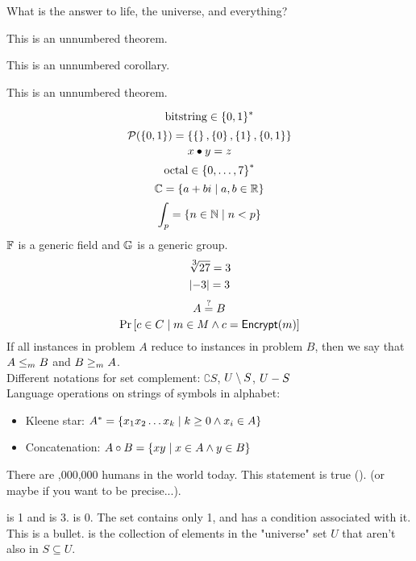 \documentclass{article}
\begin{document}
\begin{problem}
    What is the answer to life, the universe, and everything?
\end{problem}
\begin{solution}
    \begin{theorem*}
        This is an unnumbered theorem.
    \end{theorem*}
    \begin{corollary*}
        This is an unnumbered corollary.
    \end{corollary*}
    \begin{lemma*}
        This is an unnumbered theorem.
    \end{lemma*}
    $$\str{bitstring} \in \bitset$$
    $$\mathcal{P}(\left\{ 0,1 \right\}) = \left\{ \left\{  \right\}, \left\{ 0 \right\}, \left\{ 1 \right\}, \left\{ 0,1 \right\} \right\}$$
    $$x \bullet y = z$$
    $$\str{octal} \in \lset{0}{7}^*$$
    $$\mathbb{C} = \left\{ a + bi \mid a,b \in \mathbb{R} \right\}$$
    $$\int_{p} = \left\{ n \in \mathbb{N} \mid n < p \right\}$$
    $\mathbb{F}$ is a generic field and $\mathbb{G}$ is a generic group.\\
    $$\nthroot{3}{27} = 3$$
    $$\left| -3 \right| = 3$$
    $$ A \stackrel{?}{=} B$$
    $$\mbox{Pr}\left[c \in C \mid m \in M \land c = \textsf{Encrypt}(m) \right]$$
    If all instances in problem $A$ reduce to instances in problem $B$, then we say that $A \leq_m B$ and $B \geq_m A$.\\
    Different notations for set complement: $\complement{S}$, $U\setminus{S}$, $U-S$\\
    Language operations on strings of symbols in alphabet:
    \begin{itemize}
        \item Kleene star: ${A}^* = \left\{ x_1 x_2 \ldots x_k \mid k \geq 0 \land x_i \in A \right\}$
        \item Concatenation: $A \circ B = \left\{ xy \mid x \in A \land y \in B \right\}$
    \end{itemize}
    \par There are ,000,000 humans in the world today. This statement is true (\true). (or maybe \false if you want to be precise...). 
    \par {} is 1 and  is 3.  is 0. The set  contains only 1, and  has a condition associated with it. This \bigcdot is a bullet.  is the collection of elements in the "universe" set $U$ that aren't also in $S \subseteq U$.

\end{solution}
\end{document}
